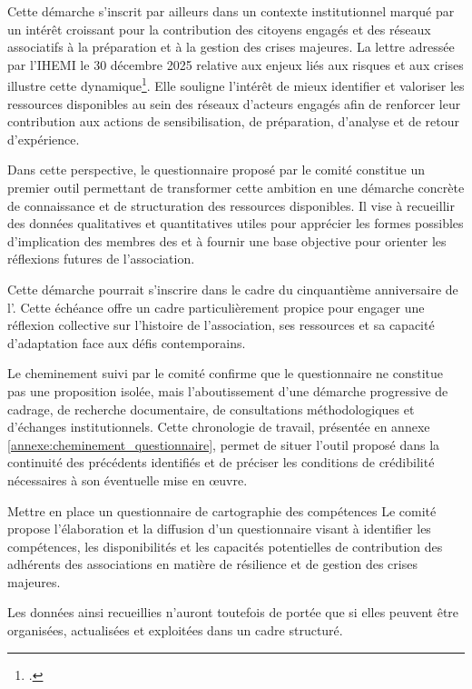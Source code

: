 Cette démarche s'inscrit par ailleurs dans un contexte institutionnel marqué par un intérêt croissant pour la contribution des citoyens engagés et des réseaux associatifs à la préparation et à la gestion des crises majeures. La lettre adressée par l'IHEMI le 30 décembre 2025 relative aux enjeux liés aux risques et aux crises illustre cette dynamique\footcite{IHEMI:2025:LIREC75}. Elle souligne l'intérêt de mieux identifier et valoriser les ressources disponibles au sein des réseaux d'acteurs engagés afin de renforcer leur contribution aux actions de sensibilisation, de préparation, d'analyse et de retour d'expérience.

Dans cette perspective, le questionnaire proposé par le comité constitue un premier outil permettant de transformer cette ambition en une démarche concrète de connaissance et de structuration des ressources disponibles. Il vise à recueillir des données qualitatives et quantitatives utiles pour apprécier les formes possibles d'implication des membres des \AssociationsUnionIHEDN et à fournir une base objective pour orienter les réflexions futures de l'association.

Cette démarche pourrait s'inscrire dans le cadre du cinquantième anniversaire de l'\ARSeize{}. Cette échéance offre un cadre particulièrement propice pour engager une réflexion collective sur l'histoire de l'association, ses ressources et sa capacité d'adaptation face aux défis contemporains.

Le cheminement suivi par le comité confirme que le questionnaire ne constitue pas une proposition isolée, mais l'aboutissement d'une démarche progressive de cadrage, de recherche documentaire, de consultations méthodologiques et d'échanges institutionnels. Cette chronologie de travail, présentée en annexe \ref{annexe:cheminement_questionnaire}, permet de situer l'outil proposé dans la continuité des précédents identifiés et de préciser les conditions de crédibilité nécessaires à son éventuelle mise en \oe{}uvre.

\begin{subproposition}{Mettre en place un questionnaire de cartographie des compétences}
Le comité propose l'élaboration et la diffusion d'un questionnaire visant à identifier les compétences, les disponibilités et les capacités potentielles de contribution des adhérents des associations en matière de résilience et de gestion des crises majeures.
\end{subproposition}

Les données ainsi recueillies n'auront toutefois de portée que si elles peuvent être organisées, actualisées et exploitées dans un cadre structuré.

